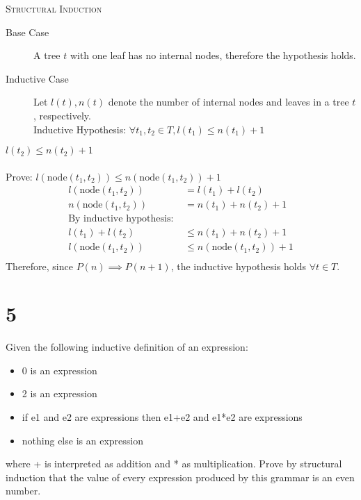 \documentclass{article}
\begin{document}
\newpage

\textsc{Structural Induction}
\begin{description}
\item[Base Case] A tree $t$ with one leaf has no internal nodes, therefore the hypothesis holds.
\item[Inductive Case] Let $l(t),n(t)$ denote the number of internal nodes and leaves in a tree $t$, respectively.\\
Inductive Hypothesis: $\forall t_1, t_2 \in T, l(t_1) \leq n(t_1) + 1$
\end{description}
\hspace{17em} $l(t_2) \leq n(t_2) + 1$\\\\
Prove: $l(\text{node}(t_1, t_2)) \leq n(\text{node}(t_1, t_2)) + 1$
\begin{align*}
l(\text{node}(t_1, t_2)) &= l(t_1) + l(t_2) \\
n(\text{node}(t_1, t_2)) &= n(t_1) + n(t_2) + 1\\
\text{By inductive hypothesis: }&\\
l(t_1) + l(t_2) & \leq n(t_1) + n(t_2) + 1\\
l(\text{node}(t_1, t_2)) & \leq n(\text{node}(t_1, t_2)) + 1\\
\end{align*}
Therefore, since $P(n) \implies P(n+1)$, the inductive hypothesis holds $\forall t \in T$.



\section*{5}
Given the following inductive definition of an expression:

\begin{itemize}
\item 0 is an expression
\item 2 is an expression
\item if e1 and e2 are expressions then e1+e2 and e1*e2 are expressions
\item nothing else is an expression
\end{itemize}

\noindent where + is interpreted as addition and * as multiplication. Prove by structural induction that the value of every expression produced by this grammar is an even number.
\end{document}
